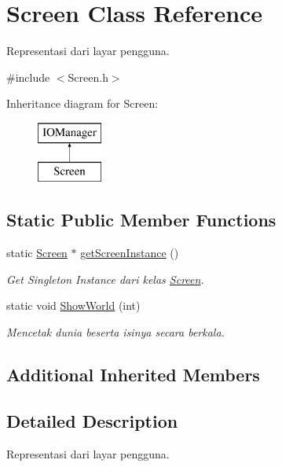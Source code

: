 \hypertarget{class_screen}{}\section{Screen Class Reference}
\label{class_screen}


Representasi dari layar pengguna.  




{\ttfamily \#include $<$Screen.\+h$>$}

Inheritance diagram for Screen\+:\begin{figure}[H]
\begin{center}
\leavevmode
\includegraphics[height=2.000000cm]{class_screen}
\end{center}
\end{figure}
\subsection*{Static Public Member Functions}
\begin{DoxyCompactItemize}
\item 
static \hyperlink{class_screen}{Screen} $\ast$ \hyperlink{class_screen_a6600999f98834ff40a2a42d291867db2}{get\+Screen\+Instance} ()
\begin{DoxyCompactList}\small\item\em Get Singleton Instance dari kelas \hyperlink{class_screen}{Screen}. \end{DoxyCompactList}\item 
static void \hyperlink{class_screen_a116d9815de49d2a74bc3c558e4322130}{Show\+World} (int)
\begin{DoxyCompactList}\small\item\em Mencetak dunia beserta isinya secara berkala. \end{DoxyCompactList}\end{DoxyCompactItemize}
\subsection*{Additional Inherited Members}


\subsection{Detailed Description}
Representasi dari layar pengguna. 

